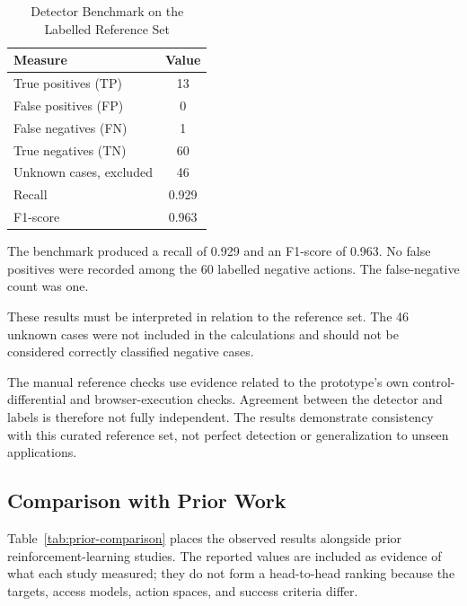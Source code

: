 \documentclass[conference]{IEEEtran}
\begin{document}
\begin{table}[!t]
\caption{Detector Benchmark on the Labelled Reference Set}
\label{tab:benchmark-results}
\centering
\footnotesize
\begin{tabular}{lc}
\toprule
\textbf{Measure} & \textbf{Value}\\
\midrule
True positives (TP) & 13\\
False positives (FP) & 0\\
False negatives (FN) & 1\\
True negatives (TN) & 60\\
Unknown cases, excluded & 46\\
Recall & 0.929\\
F1-score & 0.963\\
\bottomrule
\end{tabular}
\end{table}

The benchmark produced a recall of 0.929 and an F1-score of
0.963. No false positives were recorded among the 60 labelled
negative actions. The false-negative count was one.

These results must be interpreted in relation to the
reference set. The 46 unknown cases were not included
in the calculations and should not be considered correctly
classified negative cases.

The manual reference checks use evidence related to the
prototype's own control-differential and browser-execution
checks. Agreement between the detector and labels is
therefore not fully independent. The results demonstrate
consistency with this curated reference set, not perfect
detection or generalization to unseen applications.

\subsection{Comparison with Prior Work}

Table~\ref{tab:prior-comparison} places the observed results
alongside prior reinforcement-learning studies. The reported
values are included as evidence of what each study measured;
they do not form a head-to-head ranking because the targets,
access models, action spaces, and success criteria differ.
\end{document}
